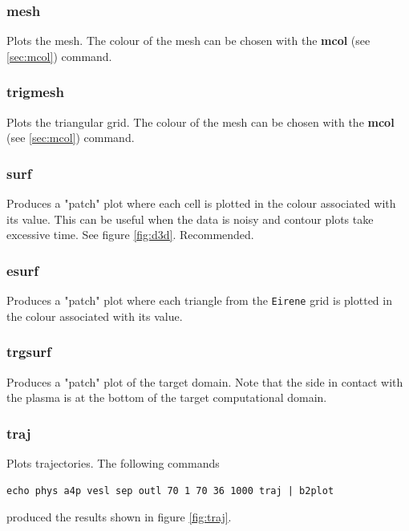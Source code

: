\documentclass[a4paper,10pt]{report}
\begin{document}
\subsubsection{mesh}\label{sec:mesh}
Plots the mesh. The colour of the mesh can be chosen
with the {\bf mcol} (see \ref{sec:mcol}) command.

\subsubsection{trigmesh}\label{sec:trigmesh}
Plots the triangular grid. The colour of the mesh can be chosen
with the {\bf mcol} (see \ref{sec:mcol}) command.

\subsubsection{surf}\label{sec:surf}
Produces a "patch" plot where each cell is plotted in the
colour associated with its value.  This can be useful when the data is
noisy and contour plots take excessive time.  See figure \ref{fig:d3d}.
Recommended.

\subsubsection{esurf}\label{sec:esurf}
Produces a "patch" plot where each triangle from the {\tt Eirene} grid
is plotted in the colour associated with its value.

\subsubsection{trgsurf}\label{sec:trgsurf}
Produces a "patch" plot of the target domain.
Note that the side in contact with the plasma is at the bottom of the target computational domain.

\subsubsection{traj}\label{sec:traj}\label{sec:uuse}\label{sec:vvse}\label{sec:t_hashp}\label{sec:lint}\label{sec:logt}

Plots trajectories.  The following commands
\begin{verbatim}
echo phys a4p vesl sep outl 70 1 70 36 1000 traj | b2plot
\end{verbatim}
produced the results shown in figure \ref{fig:traj}.
\end{document}
